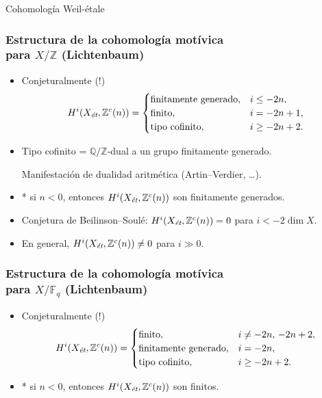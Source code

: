 \documentclass[handout]{beamer}
\newcommand{\FF}{\mathbb{F}}
\newcommand{\QQ}{\mathbb{Q}}
\newcommand{\ZZ}{\mathbb{Z}}
\newcommand{\et}{\text{\it ét}}
\begin{document}

\begin{frame}[plain]
  \headingfont

  \begin{center}
    {\huge Cohomología Weil-étale}
  \end{center}
\end{frame}


\begin{frame}
  \frametitle{Estructura de la cohomología motívica\\para $X/\ZZ$ (Lichtenbaum)}

  \begin{itemize}
  \item Conjeturalmente (!)
    \[ H^i (X_\et, \ZZ^c (n)) = \begin{cases}
        \text{finitamente generado}, & i \le -2n, \\
        \text{finito}, & i = -2n + 1, \\
        \text{tipo cofinito}, & i \ge -2n + 2.
    \end{cases} \]

  \item Tipo cofinito = $\QQ/\ZZ$-dual a un grupo finitamente generado.

    Manifestación de dualidad aritmética (Artin--Verdier, \ldots).

  \item * si $n < 0$, entonces $H^i (X_\et, \ZZ^c (n))$ son finitamente generados.

  \item Conjetura de Beilinson--Soulé: $H^i (X_\et, \ZZ^c (n)) = 0$ para
    $i < -2\dim X$.

  \item En general, $H^i (X_\et, \ZZ^c (n)) \ne 0$ para $i \gg 0$.
  \end{itemize}
\end{frame}


\begin{frame}
  \frametitle{Estructura de la cohomología motívica\\para $X/\FF_q$ (Lichtenbaum)}

  \begin{itemize}
  \item Conjeturalmente (!)
    \[ H^i (X_\et, \ZZ^c (n)) = \begin{cases}
        \text{finito}, & i \ne -2n, \, -2n+2, \\
        \text{finitamente generado}, & i = -2n, \\
        \text{tipo cofinito}, & i \ge -2n + 2.
      \end{cases} \]

  \item * si $n < 0$, entonces $H^i (X_\et, \ZZ^c (n))$ son finitos.
  \end{itemize}
\end{frame}
\end{document}
